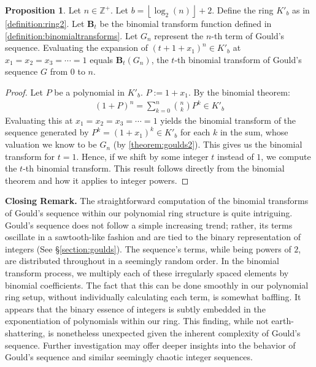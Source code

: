 \documentclass{article}
\theoremstyle{plain}
\theoremstyle{definition}
\newtheorem{proposition}{Proposition}
\newcommand{\floor}[1]{\left\lfloor #1 \right\rfloor}
\newcommand{\Z}{\mathbb{Z}}
\newcommand{\K}{K}
\newcommand{\BT}{\textbf{B}}
\begin{document}
\begin{proposition} \label{proposition:gouldbinomialtransforms}
Let $n \in \Z^+$. Let $b={\floor{\log_2(n)}+2}$. Define the ring $\K'_b$ as in \cref{definition:ring2}. Let $\BT_t$ be the binomial transform function defined in \cref{definition:binomialtransforms}. Let $G_n$ represent the $n$-th term of Gould's sequence. Evaluating the expansion of $(t + 1 + x_1)^n \in \K'_b$ at $x_1=x_2=x_3=\cdots=1$ equals $\BT_t(G_n)$, the $t$-th binomial transform of Gould's sequence $G$ from $0$ to $n$.
\end{proposition}
\begin{proof}
Let $P$ be a polynomial in $\K'_b$. $P := 1 + x_1$. By the binomial theorem:
\begin{align*}
    (1 + P)^n = \sum_{k=0}^{n} \binom{n}{k} P^k \in \K'_b
\end{align*}
Evaluating this at $x_1=x_2=x_3=\cdots=1$ yields the binomial transform of the sequence generated by $P^k = (1 + x_1)^k \in \K'_b$ for each $k$ in the sum, whose valuation we know to be $G_n$ (by \cref{theorem:goulds2}). This gives us the binomial transform for $t=1$. Hence, if we shift by some integer $t$ instead of $1$, we compute the $t$-th binomial transform. This result follows directly from the binomial theorem and how it applies to integer powers.
\end{proof}

\textbf{Closing Remark.}
The straightforward computation of the binomial transforms of Gould's sequence within our polynomial ring structure is quite intriguing. Gould's sequence does not follow a simple increasing trend; rather, its terms oscillate in a sawtooth-like fashion and are tied to the binary representation of integers (See \S\ref{section:goulds}). The sequence's terms, while being powers of $2$, are distributed throughout in a seemingly random order. In the binomial transform process, we multiply each of these irregularly spaced elements by binomial coefficients. The fact that this can be done smoothly in our polynomial ring setup, without individually calculating each term, is somewhat baffling. It appears that the binary essence of integers is subtly embedded in the exponentiation of polynomials within our ring. This finding, while not earth-shattering, is nonetheless unexpected given the inherent complexity of Gould's sequence. Further investigation may offer deeper insights into the behavior of Gould's sequence and similar seemingly chaotic integer sequences.

\begingroup
\raggedright


\endgroup
\end{document}
